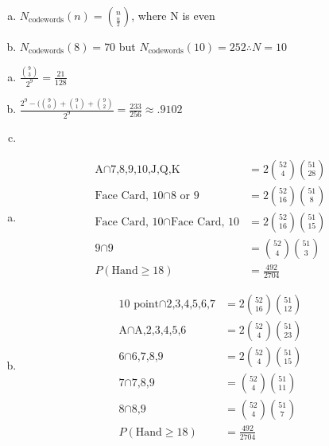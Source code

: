 \documentclass[12pt]{article}
\newenvironment{problem}[2][Problem]{\begin{trivlist}
\item[\hskip \labelsep {\bfseries #1}\hskip \labelsep {\bfseries #2.}]
  \vspace{1 cm}
}{\end{trivlist}}
\begin{document}
\begin{problem}{2.37}
\item
  \begin{enumerate}[a.]
    \item %
      $N_\textrm{codewords}(n) = \binom{n}{\frac{n}{2}}$, where N is even
    \item %
      $N_\textrm{codewords}(8) = 70$ but $N_\textrm{codewords}(10) = 252 \therefore N = 10$
  \end{enumerate}
\end{problem}

\begin{problem}{2.39} %
\item
  \begin{enumerate}[a.]
    \item %
      $\frac{\binom{9}{3}}{2^9} = \frac{21}{128}$
    \item %
      $\frac{2^9 - (\binom{9}{0} + \binom{9}{1} + \binom{9}{2}}{2^9} 
      =  \frac{233}{256} \approx .9102$
    \item %
  \end{enumerate}
\end{problem}

\begin{problem}{2.41} %
 \item
   \begin{enumerate}[a.]
    \item %
      \begin{align*}
        \textrm{A} \cap \textrm{7,8,9,10,J,Q,K} &= 2 \binom{52}{4} \binom{51}{28} \\
        \textrm{Face Card, 10} \cap \textrm{8 or 9} &= 2 \binom{52}{16} \binom{51}{8} \\
        \textrm{Face Card, 10} \cap \textrm{Face Card, 10} &= 2 \binom{52}{16} \binom{51}{15} \\
        \textrm{9} \cap \textrm{9} &= \binom{52}{4} \binom{51}{3} \\
        P(\textrm{Hand} \geq 18) &= \frac{492}{2704}
       \end{align*}
    \item %
      \begin{align*}
        \textrm{10 point} \cap \textrm{2,3,4,5,6,7} &= 2 \binom{52}{16} \binom{51}{12} \\
        \textrm{A} \cap \textrm{A,2,3,4,5,6} &= 2 \binom{52}{4} \binom{51}{23} \\
        \textrm{6} \cap \textrm{6,7,8,9} &= 2 \binom{52}{4} \binom{51}{15} \\
        \textrm{7} \cap \textrm{7,8,9} &= \binom{52}{4} \binom{51}{11} \\
        \textrm{8} \cap \textrm{8,9} &= \binom{52}{4} \binom{51}{7} \\
        P(\textrm{Hand} \geq 18) &= \frac{492}{2704}
      \end{align*}
  \end{enumerate}
\end{problem}
\end{document}
